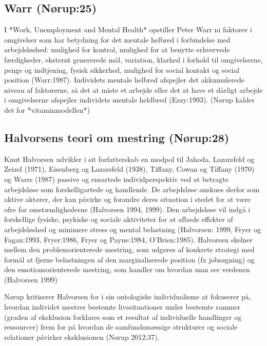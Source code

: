 \subsection{Warr (Nørup:25) \label{}}
I *Work, Unemployment and Mental Health* opstiller Peter Warr ni faktorer i omgivelser som har betydning for det mentale helbred i forbindelse med arbejdsløshed: mulighed for kontrol, mulighed for at benytte erhvervede færdigheder, eksternt genererede mål, variation, klarhed i forhold til omgivelserne, penge og  indtjening, fysisk sikkerhed, mulighed for social kontakt og social position (Warr:1987). Individets mentale helbred afspejler det akkumulerede niveau af faktorerne, så det at miste et arbejde eller det at have et dårligt arbejde i omgivelserne afspejler individets mentale heldbred (Ezzy:1993). (Nørup kalder det for *vitaminmodellen*)

\subsection{Halvorsens teori om mestring (Nørup:28) \label{}}
Knut Halvorsen udvikler i sit forfatterskab en modpol til Jahoda, Lazarsfeld og Zeizel (1971), Eisenberg og Lazarsfeld (1938), Tiffany, Cowan og Tiffany (1970) og Warrs (1987) passive og ensartede individperspektiv ved at betragte arbejdsløse som forskelligartede og handlende. De arbejdsløse anskues derfor som aktive aktører, der kan påvirke og forandre deres situation i stedet for at være ofre for omstændighederne (Halvorsen 1994, 1999). Den arbejdsløse vil indgå i forskellige fysiske, psykiske og sociale aktiviteter for at afbøde effekter af arbejdsløshed og minimere stress og mental belastning (Halvorsen: 1999, Fryer og Fagan:1993, Fryer:1986, Fryer og Payne:1984, O’Brien:1985). Halvorsen skelner mellem den problemorienterede mestring, som udgøres af konkrete strategi med formål at fjerne belastningen af den marginaliserede position (fx jobsøgning) og den emotionsorienterede mestring, som handler om hvordan man ser verdenen (Halvorsen 1999)

Nørup kritiserer Halvorsen for i sin ontologiske individualisme at fokuserer på, hvordan individet mestrer bestemte livssituationer under bestemte rammer (graden af eksklusion forklares som et resultat af individuelle handlinger og ressourcer) frem for på hvordan de samfundsmæssige strukturer og sociale relationer påvirker eksklusionen (Nørup 2012:37).

